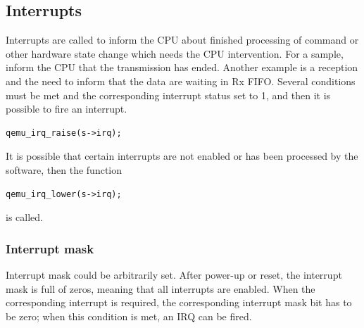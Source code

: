 \documentclass{ctuthesis}
\begin{document}
 \subsection{Interrupts}
 Interrupts are called to inform the CPU about finished processing of command or other hardware state change which needs the CPU intervention. For a sample, inform the CPU that the transmission has ended. Another example is a reception and the need to inform that the data are waiting in Rx FIFO. Several conditions must be met and the corresponding interrupt status set to 1, and then it is possible to fire an interrupt.
  \begin{verbatim}qemu_irq_raise(s->irq);\end{verbatim}
  It is possible that certain interrupts are not enabled or has been processed by the software, then the function 
  \begin{verbatim}qemu_irq_lower(s->irq);\end{verbatim}
  is called.
 
  \subsubsection{Interrupt mask}
  Interrupt mask could be arbitrarily set. After power-up or reset, the interrupt mask is full of zeros, meaning that all interrupts are enabled. When the corresponding interrupt is required, the corresponding interrupt mask bit has to be zero; when this condition is met, an IRQ can be fired.
  
\end{document}
